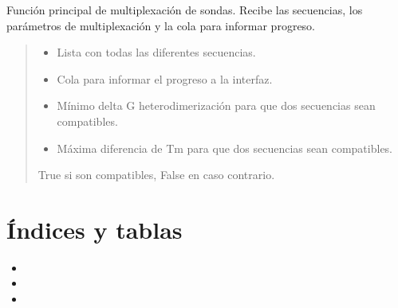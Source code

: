 \documentclass[letterpaper,10pt,spanish]{sphinxmanual}
\begin{document}
\begin{fulllineitems}
\label{\detokenize{multiplex:multiplex.multiplex_sequences}}
\pysigstartsignatures
{}
\pysigstopsignatures
\sphinxAtStartPar
Función principal de multiplexación de sondas. Recibe las secuencias, los parámetros de multiplexación y la cola para informar progreso.
\begin{quote}\begin{description}
\begin{itemize}
\item {} 
\sphinxAtStartPar
{} \textendash{} Lista con todas las diferentes secuencias.

\item {} 
\sphinxAtStartPar
{} \textendash{} Cola para informar el progreso a la interfaz.

\item {} 
\sphinxAtStartPar
{} \textendash{} Mínimo delta G heterodimerización para que dos secuencias sean compatibles.

\item {} 
\sphinxAtStartPar
{} \textendash{} Máxima diferencia de Tm para que dos secuencias sean compatibles.

\end{itemize}

\sphinxAtStartPar
True si son compatibles, False en caso contrario.

\end{description}\end{quote}

\end{fulllineitems}



\chapter{Índices y tablas}
\label{\detokenize{index:indices-y-tablas}}\begin{itemize}
\item {} 
\sphinxAtStartPar
{}

\item {} 
\sphinxAtStartPar
{}

\item {} 
\sphinxAtStartPar
{}

\end{itemize}
\end{document}
